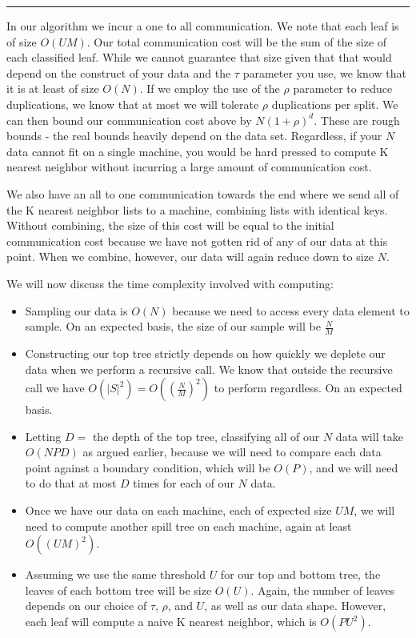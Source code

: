 \noindent\rule{12.1cm}{0.4pt}

\vspace{5 mm}
\noindent
In our algorithm we incur a one to all communication. We note that each leaf 
is of size $O(U M)$. Our total communication cost will be the sum of the size 
of each classified leaf. While we cannot guarantee that size given that that 
would depend on the construct of your data and the $\tau$ parameter you use, we 
know that it is at least of size $O(N)$. If we employ the use of the $\rho$ 
parameter to reduce duplications, we know that at most we will tolerate 
$\rho$ duplications per split. We can then bound our communication cost above 
by $N (1 + \rho)^{d}$. These are rough bounds - the real bounds heavily depend 
on the data set. Regardless, if your $N$ data cannot fit on a single machine, 
you would be hard pressed to compute K nearest neighbor without incurring a 
large amount of communication cost.

\vspace{5 mm}
\noindent
We also have an all to one communication towards the end where we send all of 
the K nearest neighbor lists to a machine, combining lists with identical keys. 
Without combining, the size of this cost will be equal to the initial 
communication cost because we have not gotten rid of any of our data at this 
point. When we combine, however, our data will again reduce down to size $N$.

\vspace{5 mm}
\noindent
We will now discuss the time complexity involved with computing:

\begin{itemize}
\item Sampling our data is $O(N)$ because we need to access every data element 
to sample. On an expected basis, the size of our sample will be $\frac{N}{M}$
\item Constructing our top tree strictly depends on how quickly we deplete our 
data when we perform a recursive call. We know that outside the recursive 
call we have $O(|S|^{2}) = O((\frac{N}{M})^{2})$ to perform regardless. On an 
expected basis.
\item Letting $D = $ the depth of the top tree, classifying all of our $N$ data 
will take $O(N P D)$ as argued earlier, because we will need to compare each 
data point against a boundary condition, which will be $O(P)$, and we will need 
to do that at most $D$ times for each of our $N$ data.
\item Once we have our data on each machine, each of expected size $U M$, we 
will need to compute another spill tree on each machine, again at least 
$O((U M )^{2})$.
\item Assuming we use the same threshold $U$ for our top and bottom tree, the 
leaves of each bottom tree will be size $O(U)$. Again, the number of leaves 
depends on our choice of $\tau$, $\rho$, and $U$, as well as our data shape. 
However, each leaf will compute a naive K nearest neighbor, which is 
$O(P U^{2})$.
\end{itemize}

